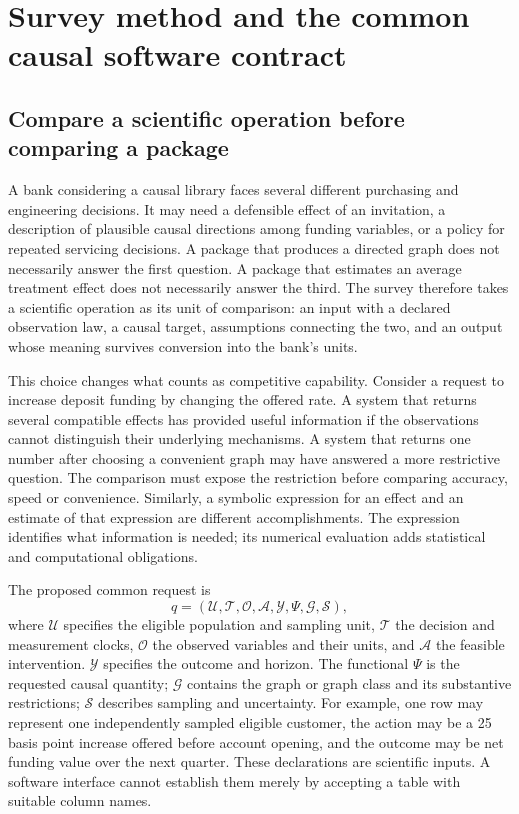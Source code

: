 \chapter{Survey method and the common causal software contract}
\label{exec13:survey}

\section{Compare a scientific operation before comparing a package}

A bank considering a causal library faces several different purchasing and
engineering decisions. It may need a defensible effect of an invitation, a
description of plausible causal directions among funding variables, or a
policy for repeated servicing decisions. A package that produces a directed
graph does not necessarily answer the first question. A package that estimates
an average treatment effect does not necessarily answer the third. The survey
therefore takes a scientific operation as its unit of comparison: an input
with a declared observation law, a causal target, assumptions connecting the
two, and an output whose meaning survives conversion into the bank's units.

This choice changes what counts as competitive capability. Consider a request
to increase deposit funding by changing the offered rate. A system that
returns several compatible effects has provided useful information if the
observations cannot distinguish their underlying mechanisms. A system that
returns one number after choosing a convenient graph may have answered a
more restrictive question. The comparison must expose the restriction before
comparing accuracy, speed or convenience. Similarly, a symbolic expression
for an effect and an estimate of that expression are different accomplishments.
The expression identifies what information is needed; its numerical evaluation
adds statistical and computational obligations.

The proposed common request is
\begin{equation}
 q=(\mathcal U,\mathcal T,\mathcal O,\mathcal A,\mathcal Y,
       \Psi,\mathcal G,\mathcal S),
 \label{exec13:request}
\end{equation}
where $\mathcal U$ specifies the eligible population and sampling unit,
$\mathcal T$ the decision and measurement clocks, $\mathcal O$ the observed
variables and their units, and $\mathcal A$ the feasible intervention.
$\mathcal Y$ specifies the outcome and horizon. The functional $\Psi$ is the
requested causal quantity; $\mathcal G$ contains the graph or graph class and
its substantive restrictions; $\mathcal S$ describes sampling and uncertainty.
For example, one row may represent one independently sampled eligible
customer, the action may be a 25 basis point increase offered before account
opening, and the outcome may be net funding value over the next quarter.
These declarations are scientific inputs. A software interface cannot establish
them merely by accepting a table with suitable column names.

